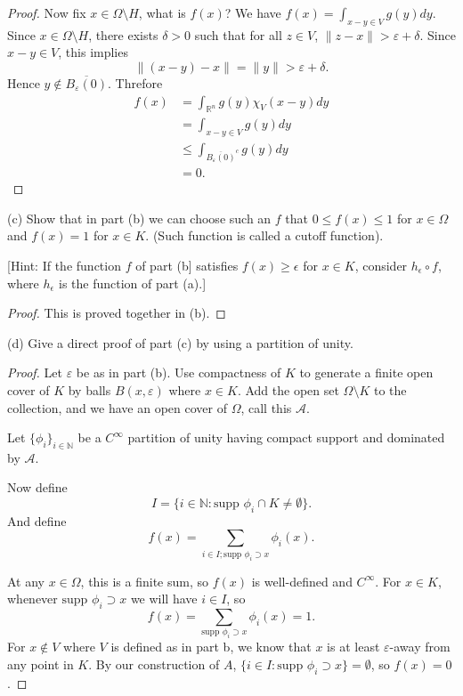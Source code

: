 \begin{proof}
	Now fix $x \in \Omega \setminus H$, what is $f(x)$? We have $f(x) = \int _{x- y \in V} g(y) d y$. Since $x \in \Omega\setminus H$, there exists $\delta>0$ such that for all $z \in V$, $\| z - x\| > \varepsilon + \delta$. Since $x - y \in V$, this implies
	\[
		\|(x-y) - x\| = \|y\| > \varepsilon + \delta
	.\] 
	Hence $y \not\in \overline{B_\varepsilon(0)} $. Threfore
	\begin{align*}
		f(x) 
		&= \int_{\mathbb{R}^n } g(y) \chi_V(x -y) d y \\
		&= \int _{x - y \in V} g\left( y \right) d y \\
		&\le  \int_{\overline{B_\varepsilon(0)}^c} g(y) d y \\
		&= 0
	.\end{align*}


	
\end{proof}

\newpage
(c) Show that in part (b) we can choose such an $f$ that $0 \leq f(x) \leq 1$ for $x \in \Omega$ and $f(x)=1$ for $x \in K$. (Such function is called a cutoff function).

[Hint: If the function $f$ of part (b] satisfies $f(x) \geq \epsilon$ for $x \in K$, consider $h_{\epsilon} \circ f$, where $h_{\epsilon}$ is the function of part (a).]

\begin{proof}
	This is proved together in (b).
\end{proof}


\newpage
(d) Give a direct proof of part (c) by using a partition of unity. 

\begin{proof}
	Let $\varepsilon$ be as in part (b).
	Use compactness of $K$ to generate a finite open cover of $K$ by balls $B(x, \varepsilon)$ where $x \in K$. Add the open set $\Omega \setminus K$ to the collection, and we have an open cover of $\Omega$, call this $\mathcal{A}$.

	Let $\{\phi_i\} _{i \in \mathbb{N}}$ be a $C^\infty $ partition of unity having compact support and dominated by $\mathcal{A}$. 

	Now define
	\[
		I = \{i \in \mathbb{N}: \text{supp }\phi_i \cap K \neq  \emptyset \} 
	.\] 
	And define
	\[
		f(x) = \sum_{i \in I; \text{supp }\phi_i \supset x} \phi_i(x)
	.\] 

	At any $x \in \Omega$, this is a finite sum, so $f(x)$ is well-defined and $C^{\infty }$. For $x \in K$, whenever $\text{supp }\phi_i \supset x$ we will have $i \in I$, so
	\[
		f(x) = \sum_{\text{supp }\phi_i \supset x} \phi_i(x) = 1
	.\] 
	For $x \not\in V$ where $V$ is defined as in part b, we know that $x$ is at least $\varepsilon$-away from any point in $K$. By our construction of $A$, $\{i \in I: \text{supp }\phi_i \supset x\}  = \emptyset $, so $f(x) = 0$.
\end{proof}


